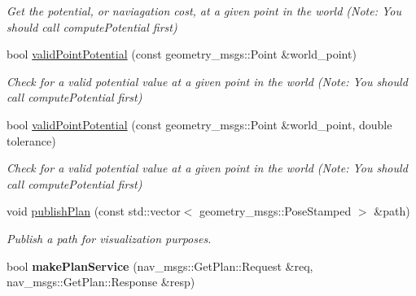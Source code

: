 \begin{DoxyCompactItemize}
\begin{DoxyCompactList}\small\item\em Get the potential, or naviagation cost, at a given point in the world (Note\+: You should call compute\+Potential first) \end{DoxyCompactList}\item 
bool \mbox{\hyperlink{classglobal__planner_1_1_global_planner_a7c50827ebb21a48825d55bda56dd38ac}{valid\+Point\+Potential}} (const geometry\+\_\+msgs\+::\+Point \&world\+\_\+point)
\begin{DoxyCompactList}\small\item\em Check for a valid potential value at a given point in the world (Note\+: You should call compute\+Potential first) \end{DoxyCompactList}\item 
bool \mbox{\hyperlink{classglobal__planner_1_1_global_planner_a27405d9450075e6dcc7fc73bd56fb6dc}{valid\+Point\+Potential}} (const geometry\+\_\+msgs\+::\+Point \&world\+\_\+point, double tolerance)
\begin{DoxyCompactList}\small\item\em Check for a valid potential value at a given point in the world (Note\+: You should call compute\+Potential first) \end{DoxyCompactList}\item 
\mbox{\label{classglobal__planner_1_1_global_planner_a9844153b2bea9032522a2ed528be963f}} 
void \mbox{\hyperlink{classglobal__planner_1_1_global_planner_a9844153b2bea9032522a2ed528be963f}{publish\+Plan}} (const std\+::vector$<$ geometry\+\_\+msgs\+::\+Pose\+Stamped $>$ \&path)
\begin{DoxyCompactList}\small\item\em Publish a path for visualization purposes. \end{DoxyCompactList}\item 
\mbox{\label{classglobal__planner_1_1_global_planner_a760dc206a99babddfacded0558d35208}} 
bool {\bfseries make\+Plan\+Service} (nav\+\_\+msgs\+::\+Get\+Plan\+::\+Request \&req, nav\+\_\+msgs\+::\+Get\+Plan\+::\+Response \&resp)
\end{DoxyCompactItemize}
